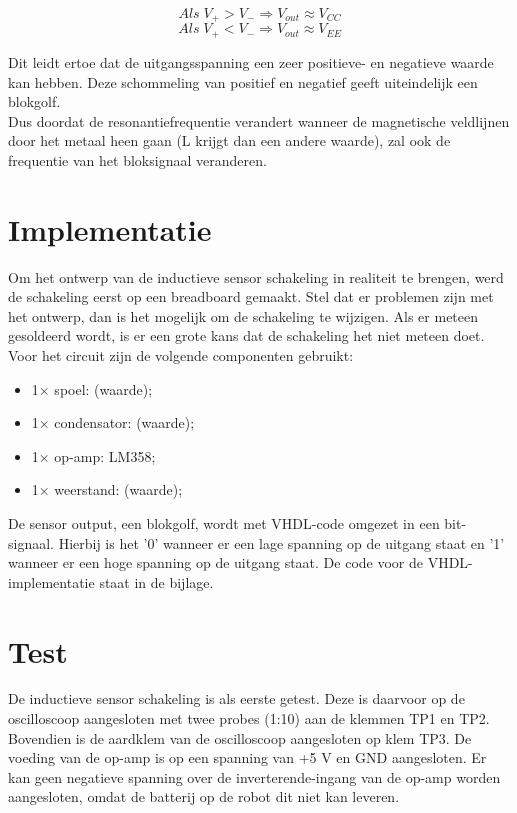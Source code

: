 \documentclass{report}
\begin{document}
\begin{equation}
Als \;V_+>V_- \Rightarrow V_{out}\approx V_{CC}
\end{equation}
\begin{equation}
Als \; V_+<V_- \Rightarrow V_{out}\approx V_{EE}
\end{equation}

Dit leidt ertoe dat de uitgangsspanning een zeer positieve- en negatieve waarde kan hebben. Deze schommeling van positief en negatief geeft uiteindelijk een blokgolf.\\

Dus doordat de resonantiefrequentie verandert wanneer de magnetische veldlijnen door het metaal heen gaan (L krijgt dan een andere waarde), zal ook de frequentie van het bloksignaal veranderen. 

\section{Implementatie}
Om het ontwerp van de inductieve sensor schakeling in realiteit te brengen, werd de schakeling eerst op een breadboard gemaakt. Stel dat er problemen zijn met het ontwerp, dan is het mogelijk om de schakeling te wijzigen. Als er meteen gesoldeerd wordt, is er een grote kans dat de schakeling het niet meteen doet.\\ 

\noindent Voor het circuit zijn de volgende componenten gebruikt:
\begin{itemize}
\item 1$\times$ spoel: (waarde);
\item 1$\times$ condensator: (waarde);
\item 1$\times$ op-amp: LM358;
\item 1$\times$ weerstand: (waarde);
\end{itemize}

De sensor output, een blokgolf, wordt met VHDL-code omgezet in een bit-signaal. Hierbij is het '0' wanneer er een lage spanning op de uitgang staat en '1' wanneer er een hoge spanning op de uitgang staat. De code voor de VHDL-implementatie staat in de bijlage.

\section{Test}
De inductieve sensor schakeling is als eerste getest. Deze is daarvoor op de oscilloscoop aangesloten met twee probes (1:10) aan de klemmen TP1 en TP2. Bovendien is de aardklem van de oscilloscoop aangesloten op klem TP3. De voeding van de op-amp is op een spanning van +5 V en GND aangesloten. Er kan geen negatieve spanning over de inverterende-ingang van de op-amp worden aangesloten, omdat de batterij op de robot dit niet kan leveren. 
\end{document}

